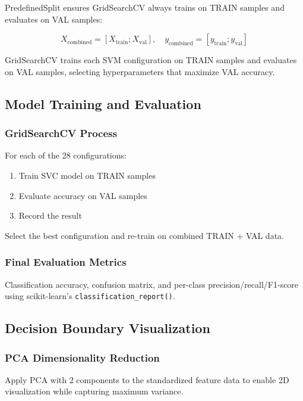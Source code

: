 \documentclass[12pt]{article}
\begin{document}
PredefinedSplit ensures GridSearchCV always trains on TRAIN samples and evaluates on VAL samples:

\begin{equation}
X_{\text{combined}} = [X_{\text{train}}; X_{\text{val}}], \quad y_{\text{combined}} = [y_{\text{train}}; y_{\text{val}}]
\end{equation}

GridSearchCV trains each SVM configuration on TRAIN samples and evaluates on VAL samples, selecting hyperparameters that maximize VAL accuracy.

\subsection{Model Training and Evaluation}

\subsubsection{GridSearchCV Process}

For each of the 28 configurations:
\begin{enumerate}
    \item Train SVC model on TRAIN samples
    \item Evaluate accuracy on VAL samples
    \item Record the result
\end{enumerate}

Select the best configuration and re-train on combined TRAIN + VAL data.

\subsubsection{Final Evaluation Metrics}

Classification accuracy, confusion matrix, and per-class precision/recall/F1-score using scikit-learn's \texttt{classification\_report()}.

\subsection{Decision Boundary Visualization}

\subsubsection{PCA Dimensionality Reduction}

Apply PCA with 2 components to the standardized feature data to enable 2D visualization while capturing maximum variance.
\end{document}
